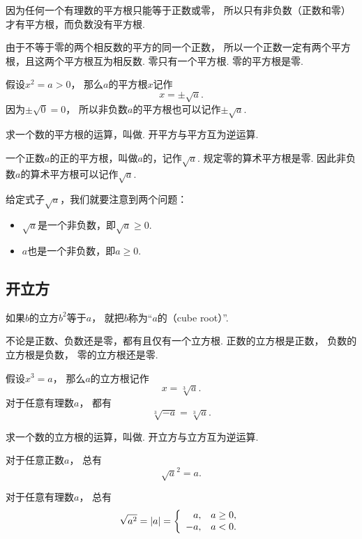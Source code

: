 因为任何一个有理数的平方根只能等于正数或零，
所以只有非负数（正数和零）才有平方根，而负数没有平方根.

由于不等于零的两个相反数的平方的同一个正数，
所以一个正数一定有两个平方根，且这两个平方根互为相反数.
零只有一个平方根.
零的平方根是零.

假设\(x^2 = a > 0\)，
那么\(a\)的平方根\(x\)记作\begin{equation*}
	x = \pm \sqrt{a}.
\end{equation*}
因为\(\pm\sqrt0 = 0\)，
所以非负数\(a\)的平方根也可以记作\(\pm\sqrt{a}\).

求一个数的平方根的运算，叫做.
开平方与平方互为逆运算.

一个正数\(a\)的正的平方根，叫做\(a\)的，记作\(\sqrt{a}\).
规定零的算术平方根是零.
因此非负数\(a\)的算术平方根可以记作\(\sqrt{a}\).

给定式子\(\sqrt{a}\)，我们就要注意到两个问题：\begin{itemize}
	\item \(\sqrt{a}\)是一个非负数，即\(\sqrt{a}\geq0\).
	\item \(a\)也是一个非负数，即\(a\geq0\).
\end{itemize}

\subsection{开立方}
如果\(b\)的立方\(b^2\)等于\(a\)，
就把\(b\)称为“\(a\)的（cube root）”.

不论是正数、负数还是零，都有且仅有一个立方根.
正数的立方根是正数，
负数的立方根是负数，
零的立方根还是零.

假设\(x^3 = a\)，
那么\(a\)的立方根记作\begin{equation*}
	x = \sqrt[3]{a}.
\end{equation*}
对于任意有理数\(a\)，
都有\begin{equation*}
	\sqrt[3]{-a} = \sqrt[3]{a}.
\end{equation*}

求一个数的立方根的运算，叫做.
开立方与立方互为逆运算.

对于任意正数\(a\)，
总有\begin{equation*}
	\sqrt{a}^2
	= a.
\end{equation*}

对于任意有理数\(a\)，
总有\begin{equation*}
	\sqrt{a^2}
	= \abs{a}
	= \left\{ \begin{array}{rl}
		a, & a\geq0, \\
		-a, & a<0.
	\end{array} \right.
\end{equation*}

